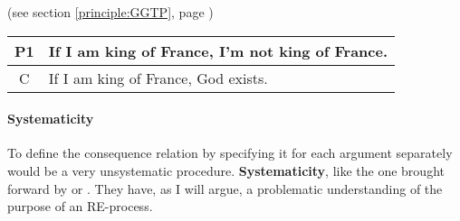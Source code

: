 \documentclass{article}
\begin{document}
(see section \ref{principle:GGTP}, page \pageref{principle:GGTP})

\begin{center}
\begin{tabular}{c p{9cm}}
P1 & If I am king of France, I'm not king of France.\\\hline
C & If I am king of France, God exists. 
\end{tabular}
\end{center}



\paragraph{Systematicity} To define the consequence relation by specifying it for each argument separately would be a very unsystematic procedure. \textbf{Systematicity}, like the one brought forward by \citeauthor{resnik0} or \citeauthor{peregrinsvoboda}. They have, as I will argue, a problematic understanding of the purpose of an RE-process.



\newpage


\end{document}
